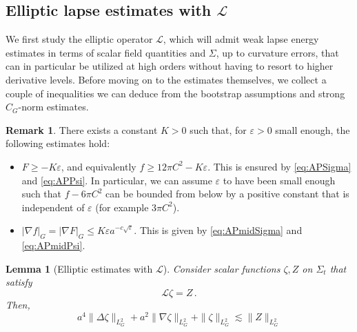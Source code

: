 \documentclass[11pt,leqno,textwidth=10cm]{amsart}
\numberwithin{equation}{section}
\theoremstyle{definition}
\newtheorem{remark}[definition]{Remark}
\theoremstyle{plain}
\newtheorem{lemma}[definition]{Lemma}
\newcommand{\1}{\mathbbm{1}}
\renewcommand{\L}{\mathcal{L}}
\newcommand{\Ric}{\text{\normalfont{Ric}}}
\renewcommand{\epsilon}{\varepsilon}
\newcommand{\Lap}{\Delta}
\begin{document}
\subsection{Elliptic lapse estimates with $\L$}\label{subsec:lapse-L}

We first study the elliptic operator $\L$, which will admit weak lapse energy estimates in terms of scalar field quantities and $\Sigma$, up to curvature errors, that can in particular be utilized at high orders without having to resort to higher derivative levels. Before moving on to the estimates themselves, we collect a couple of inequalities we can deduce from the bootstrap assumptions and strong $C_G$-norm estimates.

\begin{remark}\label{ass:lapse}
There exists a constant $K>0$ such that, for $\epsilon>0$ small enough, the following estimates hold:
\begin{itemize}
\item $F\geq -K\epsilon$, and equivalently $f\geq 12\pi C^2-K\epsilon$. This is ensured by \eqref{eq:APSigma} and \eqref{eq:APPsi}. In particular, we can assume $\epsilon$ to have been small enough such that $f-6\pi C^2$ can be bounded from below by a positive constant that is independent of $\epsilon$ (for example $3\pi C^2$).
\item $\lvert\nabla f\rvert_{G}=\lvert\nabla F\rvert_{G}\leq  K\epsilon a^{-c\sqrt{\epsilon}}$. This is given by \eqref{eq:APmidSigma} and \eqref{eq:APmidPsi}.
\end{itemize}
\end{remark}

\begin{lemma}[Elliptic estimates with $\L$]\label{lem:ell-lapse-1}
Consider scalar functions $\zeta,Z$ on $\Sigma_t$ that satisfy
\begin{equation}\label{eq:ell-L-eq}\L \zeta=Z\,.\end{equation} Then,
\begin{equation}\label{eq:ell-L-est}
a^4\|\Lap \zeta\|_{L^2_G}+a^2\|\nabla \zeta\|_{L^2_G}+\|\zeta\|_{L^2_G}\lesssim \|Z\|_{L^2_G}
\end{equation}
\end{lemma}
\end{document}
